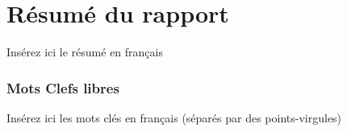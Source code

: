 
\chapter*{Résumé du rapport}%
\label{chap:abstract_fr}

Insérez ici le résumé en français\\[2em]

\subsection*{Mots Clefs libres}
Insérez ici les mots clés en français (séparés par des points-virgules)

